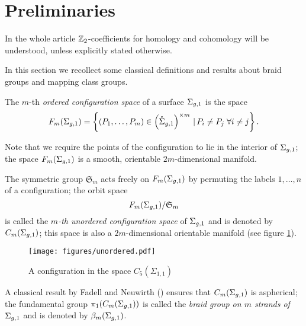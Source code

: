 \section{Preliminaries}
\label{sec:Preliminaries}
In the whole article $\mathbb{Z}_2$-coefficients for homology and cohomology will be understood,
unless explicitly stated otherwise.

In this section we recollect some classical definitions and results about braid groups and mapping class groups.

\begin{defn}
\label{defn:cms}
 The $m$-th \emph{ordered configuration space} of a surface $\Sigma_{g,1}$ is the space
\[
 F_m(\Sigma_{g,1})=\left\{(P_1,\dots,P_m) \in \left(\mathring{\Sigma}_{g,1}\right)^{\times m}  \,|\,  P_i\neq P_j  \;\forall i\neq j\right\}.
\]

 Note that we require the points of the configuration to lie in the interior of $\Sigma_{g,1}$; the space
 $F_m(\Sigma_{g,1})$ is a smooth, orientable $2m$-dimensional manifold.
 
 The symmetric group $\mathfrak{S}_m$ acts freely on $F_m(\Sigma_{g,1})$ by permuting the labels $1,\dots,n$ of a configuration;
 the orbit space
 \[
 F_m(\Sigma_{g,1})/\mathfrak{S}_m
 \]
 is called the \emph{$m$-th unordered configuration space}
 of $\Sigma_{g,1}$ and is denoted by $C_m(\Sigma_{g,1})$; this space is also a $2m$-dimensional orientable manifold
 (see figure \ref{fig:unordered}).
 
%  
\end{defn}

\begin{figure}\centering
\texttt{[image: figures/unordered.pdf]}
\caption{A configuration in the space $C_5(\Sigma_{1,1})$}
\label{fig:unordered}
\end{figure}


A classical result by Fadell and Neuwirth (\cite{FadellNeuwirth}) ensures
that $C_m(\Sigma_{g,1})$ is aspherical; the fundamental group $\pi_1(C_m(\Sigma_{g,1}))$ is
called the \emph{braid group on $m$ strands of $\Sigma_{g,1}$} and is denoted by $\beta_{m}(\Sigma_{g,1})$.

